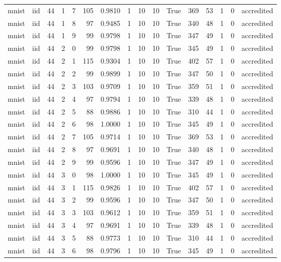 \begin{tabular}{llrrrrrrrrrrrrrl}
mnist & iid & 44 & 1 & 7 & 105 & 0.9810 & 1 & 10 & 10 & True & 369 & 53 & 1 & 0 & accredited \\
mnist & iid & 44 & 1 & 8 & 97 & 0.9485 & 1 & 10 & 10 & True & 340 & 48 & 1 & 0 & accredited \\
mnist & iid & 44 & 1 & 9 & 99 & 0.9798 & 1 & 10 & 10 & True & 347 & 49 & 1 & 0 & accredited \\
mnist & iid & 44 & 2 & 0 & 99 & 0.9798 & 1 & 10 & 10 & True & 345 & 49 & 1 & 0 & accredited \\
mnist & iid & 44 & 2 & 1 & 115 & 0.9304 & 1 & 10 & 10 & True & 402 & 57 & 1 & 0 & accredited \\
mnist & iid & 44 & 2 & 2 & 99 & 0.9899 & 1 & 10 & 10 & True & 347 & 50 & 1 & 0 & accredited \\
mnist & iid & 44 & 2 & 3 & 103 & 0.9709 & 1 & 10 & 10 & True & 359 & 51 & 1 & 0 & accredited \\
mnist & iid & 44 & 2 & 4 & 97 & 0.9794 & 1 & 10 & 10 & True & 339 & 48 & 1 & 0 & accredited \\
mnist & iid & 44 & 2 & 5 & 88 & 0.9886 & 1 & 10 & 10 & True & 310 & 44 & 1 & 0 & accredited \\
mnist & iid & 44 & 2 & 6 & 98 & 1.0000 & 1 & 10 & 10 & True & 345 & 49 & 1 & 0 & accredited \\
mnist & iid & 44 & 2 & 7 & 105 & 0.9714 & 1 & 10 & 10 & True & 369 & 53 & 1 & 0 & accredited \\
mnist & iid & 44 & 2 & 8 & 97 & 0.9691 & 1 & 10 & 10 & True & 340 & 48 & 1 & 0 & accredited \\
mnist & iid & 44 & 2 & 9 & 99 & 0.9596 & 1 & 10 & 10 & True & 347 & 49 & 1 & 0 & accredited \\
mnist & iid & 44 & 3 & 0 & 98 & 1.0000 & 1 & 10 & 10 & True & 345 & 49 & 1 & 0 & accredited \\
mnist & iid & 44 & 3 & 1 & 115 & 0.9826 & 1 & 10 & 10 & True & 402 & 57 & 1 & 0 & accredited \\
mnist & iid & 44 & 3 & 2 & 99 & 0.9596 & 1 & 10 & 10 & True & 347 & 50 & 1 & 0 & accredited \\
mnist & iid & 44 & 3 & 3 & 103 & 0.9612 & 1 & 10 & 10 & True & 359 & 51 & 1 & 0 & accredited \\
mnist & iid & 44 & 3 & 4 & 97 & 0.9691 & 1 & 10 & 10 & True & 339 & 48 & 1 & 0 & accredited \\
mnist & iid & 44 & 3 & 5 & 88 & 0.9773 & 1 & 10 & 10 & True & 310 & 44 & 1 & 0 & accredited \\
mnist & iid & 44 & 3 & 6 & 98 & 0.9796 & 1 & 10 & 10 & True & 345 & 49 & 1 & 0 & accredited \\

\end{tabular}
